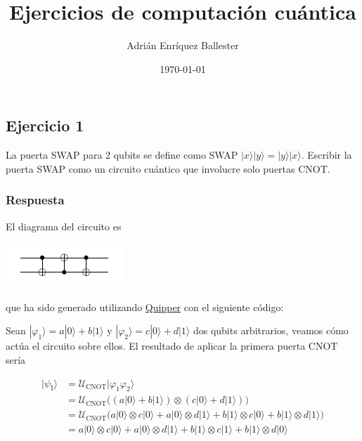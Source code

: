 \documentclass{article}
\title{Ejercicios de computación cuántica}
\author{Adrián Enríquez Ballester}
\date{\today}
\begin{document}
\maketitle

\subsection*{Ejercicio 1}

La puerta SWAP para 2 qubits se define como SWAP $|x\rangle|y\rangle
= |y\rangle|x\rangle$. Escribir la puerta SWAP como un circuito
cuántico que involucre solo puertas CNOT.

\subsubsection*{Respuesta}

El diagrama del circuito es 

\begin{center}
\includegraphics[scale=2.5]{swap-circuit.pdf}
\end{center}

que ha sido generado utilizando
\href{https://www.mathstat.dal.ca/~selinger/quipper/}{Quipper} con
el siguiente código:



Sean $|\varphi_1\rangle = a|0\rangle + b|1\rangle$
y $|\varphi_2\rangle = c|0\rangle + d|1\rangle$ dos qubits
arbitrarios, veamos cómo actúa el circuito sobre ellos. El resultado
de aplicar la primera puerta CNOT sería

\begin{align*}
  |\psi_\text{I}\rangle
    &=\mathcal{U}_\text{CNOT}|\varphi_1 \varphi_2\rangle \\
    &= \mathcal{U}_\text{CNOT}\Big(
      (a|0\rangle + b|1\rangle)
        \otimes(c|0\rangle + d|1\rangle)
      \Big) \\
    &= \mathcal{U}_\text{CNOT}\Big(
      a|0\rangle \otimes c|0\rangle
        + a|0\rangle \otimes d|1\rangle 
        + b|1\rangle \otimes c|0\rangle 
        + b|1\rangle \otimes d|1\rangle
      \Big) \\
    &= a|0\rangle \otimes c|0\rangle
        + a|0\rangle \otimes d|1\rangle 
        + b|1\rangle \otimes c|1\rangle 
        + b|1\rangle \otimes d|0\rangle
\end{align*}
\end{document}
